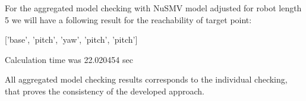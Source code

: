 For the aggregated model checking with NuSMV model adjusted for robot length 5 we will 
have a following result for the reachability of target point:

['base', 'pitch', 'yaw', 'pitch', 'pitch']

Calculation time was 22.020454 sec

All aggregated model checking results corresponds to the individual checking, 
that proves the consistency of the developed approach.


